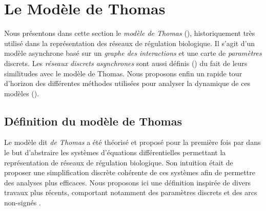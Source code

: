 
\section{Le Modèle de Thomas}

Nous présentons dans cette section le \emph{modèle de Thomas} (),
historiquement très utilisé dans la représentation des réseaux de régulation biologique.
Il s'agit d'un modèle asynchrone basé sur un \emph{graphe des interactions} et
une carte de \emph{paramètres} discrets.
Les \emph{réseaux discrets asynchrones} sont aussi définis ()
du fait de leurs similitudes avec le modèle de Thomas.
Nous proposons enfin un rapide tour d'horizon des différentes méthodes utilisées
pour analyser la dynamique de ces modèles ().

\subsection{Définition du modèle de Thomas}

Le modèle dit \emph{de Thomas} a été théorisé et proposé pour la première
fois par  dans le but d'abstraire les systèmes
d'équations différentielles permettant la représentation de réseaux de régulation biologique.
Son intuition était de proposer une simplification discrète cohérente de ces systèmes
afin de permettre des analyses plus efficaces.
Nous proposons ici une définition inspirée de divers travaux plus récents,
comportant notamment des paramètres discrets \cite{Snoussi89}
et des arcs non-signés \cite{FPIMR12-CMSB}.

\myskip


